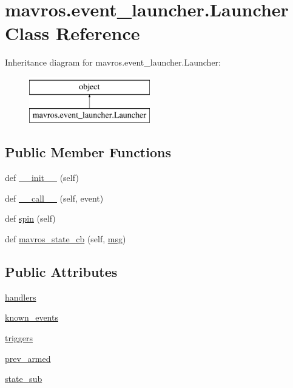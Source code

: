 \hypertarget{classmavros_1_1event__launcher_1_1Launcher}{}\section{mavros.\+event\+\_\+launcher.\+Launcher Class Reference}
\label{classmavros_1_1event__launcher_1_1Launcher}
Inheritance diagram for mavros.\+event\+\_\+launcher.\+Launcher\+:\begin{figure}[H]
\begin{center}
\leavevmode
\includegraphics[height=2.000000cm]{classmavros_1_1event__launcher_1_1Launcher}
\end{center}
\end{figure}
\subsection*{Public Member Functions}
\begin{DoxyCompactItemize}
\item 
def \mbox{\hyperlink{classmavros_1_1event__launcher_1_1Launcher_a192e461f63f91e535730ef6587ce0bf4}{\+\_\+\+\_\+init\+\_\+\+\_\+}} (self)
\item 
def \mbox{\hyperlink{classmavros_1_1event__launcher_1_1Launcher_ac4c12ab46566145be88ab2d943606e61}{\+\_\+\+\_\+call\+\_\+\+\_\+}} (self, event)
\item 
def \mbox{\hyperlink{classmavros_1_1event__launcher_1_1Launcher_a324d4d8ac61ecd99c9c94796eab3d153}{spin}} (self)
\item 
def \mbox{\hyperlink{classmavros_1_1event__launcher_1_1Launcher_a08e55669190e7460c29dc5c642849171}{mavros\+\_\+state\+\_\+cb}} (self, \mbox{\hyperlink{stratnode_8cpp_a82cfe4ed9bc9e1b07c8bf209c324d85b}{msg}})
\end{DoxyCompactItemize}
\subsection*{Public Attributes}
\begin{DoxyCompactItemize}
\item 
\mbox{\hyperlink{classmavros_1_1event__launcher_1_1Launcher_ae209d3e4f51bdad66a9506bb64e8641d}{handlers}}
\item 
\mbox{\hyperlink{classmavros_1_1event__launcher_1_1Launcher_abdb52a13878db4c4c8b2a886c75ff362}{known\+\_\+events}}
\item 
\mbox{\hyperlink{classmavros_1_1event__launcher_1_1Launcher_ab640f0f79a6eb6382f408131b8d36256}{triggers}}
\item 
\mbox{\hyperlink{classmavros_1_1event__launcher_1_1Launcher_ab8178b4e88d6ea2dc1882d975d6e7836}{prev\+\_\+armed}}
\item 
\mbox{\hyperlink{classmavros_1_1event__launcher_1_1Launcher_afb4020ce02619f4217f1079c5963f5c7}{state\+\_\+sub}}
\end{DoxyCompactItemize}


